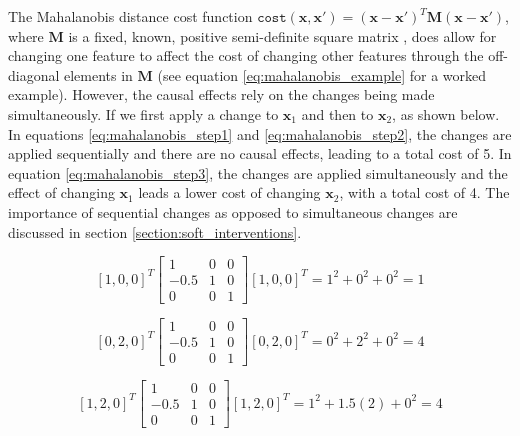 The Mahalanobis distance cost function $\texttt{cost}(\mathbf{x}, \mathbf{x}') = (\mathbf{x} -\mathbf{x}')^T\mathbf{M}(\mathbf{x} - \mathbf{x}')$, where $\mathbf{M}$ is a fixed, known, positive semi-definite square matrix \citep{bechavodInformationDiscrepancyStrategic2022}, does allow for changing one feature to affect the cost of changing other features through the off-diagonal elements in $\mathbf{M}$ (see equation \ref{eq:mahalanobis_example} for a worked example). However, the causal effects rely on the changes being made simultaneously. If we first apply a change to $\mathbf{x}_1$ and then to $\mathbf{x}_2$, as shown below. In equations \ref{eq:mahalanobis_step1} and \ref{eq:mahalanobis_step2}, the changes are applied sequentially and there are no causal effects, leading to a total cost of 5. In equation \ref{eq:mahalanobis_step3}, the changes are applied simultaneously and the effect of changing $\mathbf{x}_1$ leads a lower cost of changing $\mathbf{x}_2$, with a total cost of 4. The importance of sequential changes as opposed to simultaneous changes are discussed in section \ref{section:soft_interventions}.

\begin{equation} \label{eq:mahalanobis_step1}
	[1, 0, 0]^T \left[\begin{array}{lllll}
		1 & 0 & 0 \\
		-0.5 & 1 & 0 \\
		0 & 0 & 1
	\end{array}\right] [1, 0, 0]^T = 1^2 + 0^2 + 0^2 = 1
\end{equation}

\begin{equation} \label{eq:mahalanobis_step2}
	[0, 2, 0]^T \left[\begin{array}{lllll}
		1 & 0 & 0 \\
		-0.5 & 1 & 0 \\
		0 & 0 & 1
	\end{array}\right] [0, 2, 0]^T = 0^2 + 2^2 + 0^2 = 4
\end{equation}

\begin{equation} \label{eq:mahalanobis_step3}
	[1, 2, 0]^T \left[\begin{array}{lllll}
		1 & 0 & 0 \\
		-0.5 & 1 & 0 \\
		0 & 0 & 1
	\end{array}\right] [1, 2, 0]^T = 1^2 + 1.5(2) + 0^2 = 4
\end{equation}


